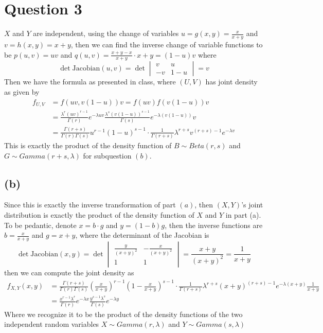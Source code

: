 \documentclass[a4paper,11pt]{article}
\begin{document}
\section*{Question 3}
$X$ and $Y$ are independent, using the change of variables $u = g(x,y) = \frac{x}{x+y}$ and $v = h(x,y) = x+y$, then we can find the inverse change of variable functions to be $p(u,v) = uv$ and $q(u,v) = 	\frac{x+y-x}{x+y} \cdot x+y = (1-u)v$
where 
$$ \det \text{Jacobian}(u,v) = \det \begin{vmatrix}
	v & u \\
	-v & 1-u
\end{vmatrix} = v$$ 
Then we have the formula as presented in class, where $(U,V)$ has joint density as given by 
\begin{align*}
	f_{U,V} &= f(uv, v(1-u))v = f(uv)f(v(1-u)) v \\
		&= \frac{\lambda^r (uv)^{r-1}}{\Gamma(r)} e^{-\lambda u v} \frac{\lambda^s(v(1-u))^{s-1}}{\Gamma(s)} e^{-\lambda(v(1-u))}v\\
		&= \frac{\Gamma(r+s)}{\Gamma(r)\Gamma(s)} u^{r-1}(1-u)^{s-1} \cdot \frac{1}{\Gamma(r+s)} \lambda^{r+s}v^{(r+s)-1}e^{-\lambda v}
\end{align*}
This is exactly the product of the density function of $B \sim Beta(r,s)$ and $G \sim Gamma(r+s,\lambda)$ for subquestion $(b)$.
\subsection*{(b)} 
Since this is exactly the inverse transformation of part $(a)$, then $(X,Y)$'s joint distribution is exactly the product of the density function of $X$ and $Y$ in part (a). To be pedantic, denote $x = b \cdot g$ and $y = (1-b)g$, then the inverse functions are 
$b = \frac{x}{x+y}$ and $g = x+y$, where the determinant of the Jacobian is 
$$ \det \text{Jacobian}(x,y) = \det \begin{vmatrix}
	\frac{y}{(x+y)^2} & - \frac{x}{(x+y)^2} \\ 
	1 & 1
\end{vmatrix} =  \frac{x+y}{(x+y)^2} = \frac{1}{x+y}$$
\clearpage
then we can compute the joint density as 
\begin{align*}
	f_{X,Y} (x,y) &= \frac{\Gamma(r+s)}{\Gamma(r)\Gamma(s)} (\frac{x}{x+y})^{r-1} (1 - \frac{x}{x+y})^{s-1} \cdot \frac{1}{\Gamma(r+s)}\lambda^{r+s} (x+y)^{(r+s)-1}e^{-\lambda(x+y)} \frac{1}{x+y} \\
		      &= \frac{x^{r-1}\lambda^r}{\Gamma(r)} e^{-\lambda x} \frac{y^{s-1}\lambda^s}{\Gamma(s)} e^{-\lambda y}
	\end{align*}
	Where we recognize it to be the product of the density functions of the two independent random variables $X \sim Gamma(r , \lambda)$ and $Y \sim Gamma(s,\lambda)$
\end{document}

